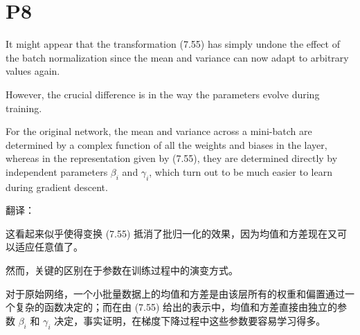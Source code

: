 \documentclass{article}
\begin{document}
\section{P8}

It might appear that the transformation (7.55) has simply undone the effect of the batch normalization since the mean and variance can now adapt to arbitrary values again. 

However, the crucial difference is in the way the parameters evolve during training. 

For the original network, the mean and variance across a mini-batch are determined by a complex function of all the weights and biases in the layer, whereas in the representation given by (7.55), they are determined directly by independent parameters $\beta_i$ and $\gamma_i$, which turn out to be much easier to learn during gradient descent.

{\color{red}
翻译：

这看起来似乎使得变换 (7.55) 抵消了批归一化的效果，因为均值和方差现在又可以适应任意值了。

然而，关键的区别在于参数在训练过程中的演变方式。

对于原始网络，一个小批量数据上的均值和方差是由该层所有的权重和偏置通过一个复杂的函数决定的；而在由 (7.55) 给出的表示中，均值和方差直接由独立的参数 $\beta_i$ 和 $\gamma_i$ 决定，事实证明，在梯度下降过程中这些参数要容易学习得多。

}
\end{document}
